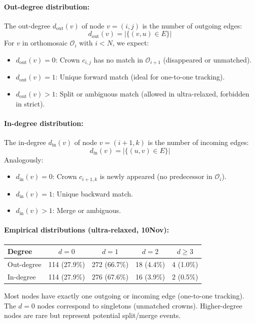 \paragraph{Out-degree distribution:} The out-degree $d_{\text{out}}(v)$ of node $v = (i,j)$ is the number of outgoing edges:
\[
d_{\text{out}}(v) = |\{(v, u) \in E\}|
\]
For $v$ in orthomosaic $\mathcal{O}_i$ with $i < N$, we expect:
\begin{itemize}
    \item $d_{\text{out}}(v) = 0$: Crown $c_{i,j}$ has no match in $\mathcal{O}_{i+1}$ (disappeared or unmatched).
    \item $d_{\text{out}}(v) = 1$: Unique forward match (ideal for one-to-one tracking).
    \item $d_{\text{out}}(v) > 1$: Split or ambiguous match (allowed in ultra-relaxed, forbidden in strict).
\end{itemize}

\paragraph{In-degree distribution:} The in-degree $d_{\text{in}}(v)$ of node $v = (i+1,k)$ is the number of incoming edges:
\[
d_{\text{in}}(v) = |\{(u, v) \in E\}|
\]
Analogously:
\begin{itemize}
    \item $d_{\text{in}}(v) = 0$: Crown $c_{i+1,k}$ is newly appeared (no predecessor in $\mathcal{O}_i$).
    \item $d_{\text{in}}(v) = 1$: Unique backward match.
    \item $d_{\text{in}}(v) > 1$: Merge or ambiguous.
\end{itemize}

\paragraph{Empirical distributions (ultra-relaxed, 10Nov):}
\begin{center}
\begin{tabular}{lcccc}
\toprule
Degree & $d=0$ & $d=1$ & $d=2$ & $d \geq 3$ \\
\midrule
Out-degree & 114 (27.9\%) & 272 (66.7\%) & 18 (4.4\%) & 4 (1.0\%) \\
In-degree & 114 (27.9\%) & 276 (67.6\%) & 16 (3.9\%) & 2 (0.5\%) \\
\bottomrule
\end{tabular}
\end{center}
Most nodes have exactly one outgoing or incoming edge (one-to-one tracking). The $d=0$ nodes correspond to singletons (unmatched crowns). Higher-degree nodes are rare but represent potential split/merge events.


